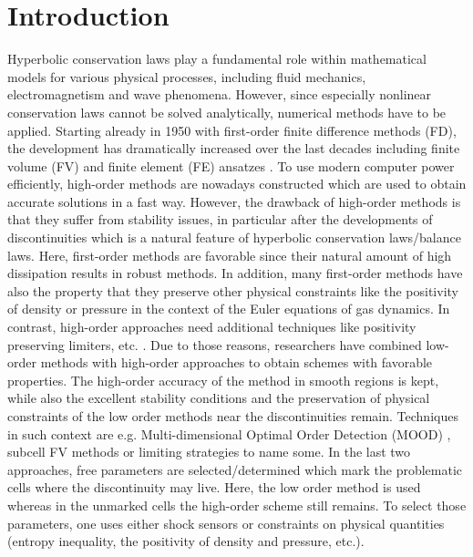 \section{Introduction} 
\label{sec:introduction} 

Hyperbolic conservation laws play a fundamental role within mathematical models for various physical processes, including fluid mechanics, electromagnetism and wave phenomena. However, since especially nonlinear conservation laws cannot be solved analytically, numerical methods have to be applied.
Starting already in 1950 with first-order finite difference methods (FD), the development has dramatically increased over the last decades including finite volume (FV) and finite element (FE) ansatzes \cite{richtmyer1994difference, du2016handbook, abgrall2017handbook}. To use modern computer power efficiently, high-order methods are nowadays constructed  which are used to obtain accurate solutions in a fast way. However, the drawback of high-order methods is that they suffer from stability issues, in particular after the developments of discontinuities which is a natural feature of hyperbolic conservation laws/balance laws. 
Here, first-order methods are favorable since their natural amount of high dissipation results in robust methods. In addition, many first-order methods have also the property that they preserve  other physical constraints like the positivity of density or pressure in the context of the Euler equations of gas dynamics.
In contrast, high-order approaches need additional techniques like positivity preserving limiters, etc. \cite{zhang2011maximum}.
Due to those reasons, researchers have combined low-order methods with high-order approaches to obtain schemes with favorable properties. The high-order accuracy of the method in smooth regions is kept, while also the excellent  stability conditions  and the  preservation of physical constraints   of the low order methods  near the discontinuities remain.  
Techniques in such context are e.g. Multi-dimensional Optimal Order Detection (MOOD) \cite{bacigaluppi2019posteriori, clain2011high}, subcell FV methods \cite{sonntag2014shock, hennemann2021provably} or limiting \cite{guermond2019invariant,kuzmin2020monolithic, kuzmin2021Limiter} strategies to name some.
In the last two approaches, free parameters are selected/determined which mark the problematic cells where the discontinuity may live. Here, the low order method is used whereas in the unmarked cells the high-order scheme still remains. 
To select those parameters, one uses either  shock sensors \cite{persson2006sub, offner2015zweidimensionale} or constraints on physical quantities  (entropy inequality, the positivity of density and pressure, etc.). 
